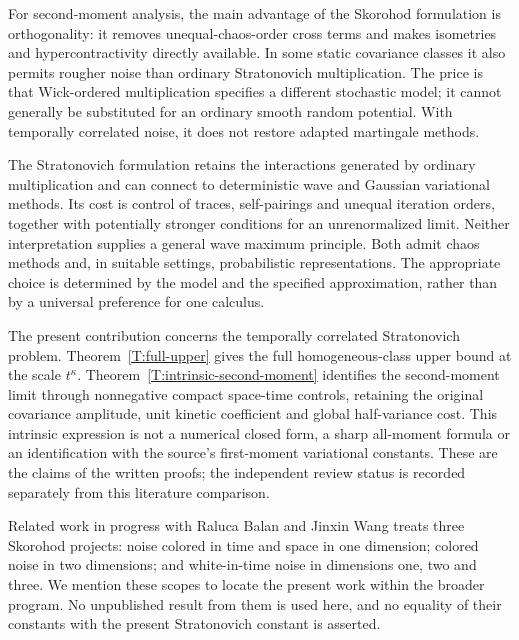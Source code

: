 For second-moment analysis, the main advantage of the Skorohod formulation is
orthogonality: it removes unequal-chaos-order cross terms and makes isometries
and hypercontractivity directly available. In some static covariance classes
it also permits rougher noise than ordinary Stratonovich multiplication. The
price is that Wick-ordered multiplication specifies a different stochastic model;
it cannot generally be substituted for an ordinary smooth random potential.
With temporally correlated noise, it does not restore adapted martingale
methods.

The Stratonovich formulation retains the interactions generated by ordinary
multiplication and can connect to deterministic wave and Gaussian variational
methods. Its cost is control of traces, self-pairings and unequal iteration
orders, together with potentially stronger conditions for an unrenormalized
limit. Neither interpretation supplies a general wave maximum principle.
Both admit chaos methods and, in suitable settings, probabilistic
representations. The appropriate choice is determined by the model and the
specified approximation, rather than by a universal preference for one
calculus.

The present contribution concerns the temporally correlated Stratonovich
problem. Theorem~\ref{T:full-upper} gives the full homogeneous-class upper bound
at the scale $t^\kappa$. Theorem~\ref{T:intrinsic-second-moment} identifies the
second-moment limit through nonnegative compact space-time controls, retaining
the original covariance amplitude, unit kinetic coefficient and global
half-variance cost. This intrinsic expression is not a numerical closed form,
a sharp all-moment formula or an identification with the source's
first-moment variational constants. These are the claims of the written
proofs; the independent review status is recorded separately from this
literature comparison.

Related work in progress with Raluca Balan and Jinxin Wang treats three
Skorohod projects: noise colored in time and space in one dimension; colored
noise in two dimensions; and white-in-time noise in dimensions one, two and
three. We mention these scopes to locate the present work within the broader
program. No unpublished result from them is used here, and no equality of
their constants with the present Stratonovich constant is asserted.
